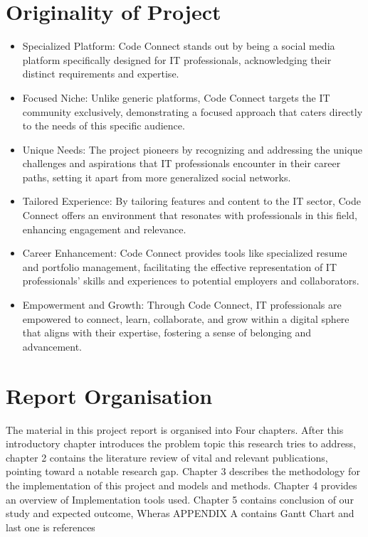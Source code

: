 \section{Originality of Project}

\begin{itemize}
    \item Specialized Platform: Code Connect stands out by being a social media platform specifically designed for IT professionals, acknowledging their distinct requirements and expertise.
    \item Focused Niche: Unlike generic platforms, Code Connect targets the IT community exclusively, demonstrating a focused approach that caters directly to the needs of this specific audience.
    \item Unique Needs: The project pioneers by recognizing and addressing the unique challenges and aspirations that IT professionals encounter in their career paths, setting it apart from more generalized social networks.
    \item Tailored Experience: By tailoring features and content to the IT sector, Code Connect offers an environment that resonates with professionals in this field, enhancing engagement and relevance.
    \item Career Enhancement: Code Connect provides tools like specialized resume and portfolio management, facilitating the effective representation of IT professionals' skills and experiences to potential employers and collaborators.

    \item Empowerment and Growth: Through Code Connect, IT professionals are empowered to connect, learn, collaborate, and grow within a digital sphere that aligns with their expertise, fostering a sense of belonging and advancement.
    
  \end{itemize}

\section{Report Organisation}
The material in this project report is organised into Four chapters. After this introductory chapter introduces the problem topic this research tries to address, chapter 2 contains the literature review of vital and relevant publications, pointing toward a notable research gap. Chapter 3 describes the methodology for the implementation of this project and models and methods. Chapter 4 provides an overview of Implementation tools used. Chapter 5 contains conclusion of our study and expected outcome, Wheras APPENDIX A contains Gantt Chart and last one is references
